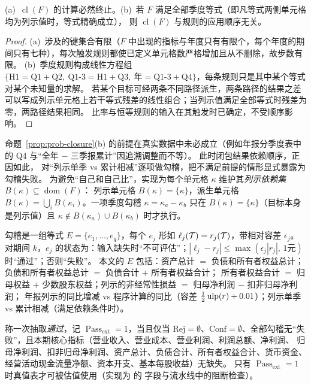 \begin{proposition}[闭包的终止性与条件唯一性]
\label{prop:prob-closure}
(a)~$\operatorname{cl}(F)$ 的计算必然终止。(b)~若 $F$ 满足全部季度等式（即凡等式两侧单元格均为列示值时，等式精确成立），
则 $\operatorname{cl}(F)$ 与规则的应用顺序无关。
\end{proposition}
\begin{proof}
(a)~涉及的键集合有限（$F$ 中出现的指标与年度只有有限个，每个年度的期间只有七种），每次触发规则都使已定义单元格数严格增加且从不删除，故步数有限。
(b)~季度规则构成线性方程组 $\{\text{H1}=\text{Q1}+\text{Q2},\ \text{Q1-3}=\text{H1}+\text{Q3},\ \text{年}=\text{Q1-3}+\text{Q4}\}$，每条规则只是其中某个等式对某个未知量的求解。
若某个目标可经两条不同路径派生，两条路径的结果之差可以写成列示单元格上若干等式残差的线性组合；当列示值满足全部等式时残差为零，两路径结果相同。
比率与恒等规则的输入在其触发时已确定，不受顺序影响。
\end{proof}

命题~\ref{prop:prob-closure}(b) 的前提在真实数据中未必成立（例如年报分季度表中的 Q4 与“全年 $-$ 三季报累计”因追溯调整而不等）。
此时闭包结果依赖顺序，正因如此， 对“列示单季 vs 累计相减”逐项做勾稽，把不满足前提的情形显式暴露为勾稽失败。
为避免“自己和自己比”，实现为每个单元格 $\kappa$ 维护其\emph{列示依赖集} $B(\kappa)\subseteq\operatorname{dom}(F)$：
列示单元格 $B(\kappa)=\{\kappa\}$，派生单元格 $B(\kappa)=\bigcup_i B(\kappa_i)$。一项季度勾稽 $\kappa = \kappa_a-\kappa_b$ 只在
$B(\kappa)=\{\kappa\}$（目标本身是列示值）且 $\kappa\notin B(\kappa_a)\cup B(\kappa_b)$ 时才执行。

\begin{definition}[勾稽]
\label{def:prob-tieout}
勾稽是一组等式 $E=\{e_1,\dots,e_q\}$，每个 $e_j$ 形如 $\ell_j(\mathcal{T})=r_j(\mathcal{T})$，带相对容差 $\epsilon_j$。
对期间 $k$，$e_j$ 的状态为：输入缺失时“不可评估”；$|\ell_j-r_j|\le\max(\epsilon_j|r_j|,\,1\text{元})$ 时“通过”；否则“失败”。
本文的 $E$ 包括：资产总计 $=$ 负债和所有者权益总计；负债和所有者权益总计 $=$ 负债合计 $+$ 所有者权益合计；
所有者权益合计 $=$ 归母权益 $+$ 少数股东权益；列示的非经常性损益 $=$ 归母净利润 $-$ 扣非归母净利润；
年报列示的同比增减 vs 程序计算的同比（容差 $\tfrac12\operatorname{ulp}(r)+0.01$）；列示单季 vs 累计相减（满足依赖条件时）。
\end{definition}

\begin{definition}[抽取通过]
\label{def:prob-extract-pass}
称一次抽取\emph{通过}，记 $\operatorname{Pass}_{\text{ext}}=1$，当且仅当
$\mathrm{Rej}=\emptyset$、$\mathrm{Conf}=\emptyset$、全部勾稽无“失败”，且本期核心指标（营业收入、营业成本、营业利润、利润总额、净利润、
归母净利润、扣非归母净利润、资产总计、负债合计、所有者权益合计、货币资金、经营活动现金流量净额、资本开支、基本每股收益）无缺失。
只有 $\operatorname{Pass}_{\text{ext}}=1$ 时真值表才可被估值使用（实现为  的  字段与流水线中的阻断检查）。
\end{definition}

